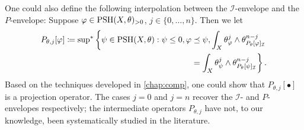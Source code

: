 \begin{remark}\label{rmk:envelopes:L2443}
    One could also define the following interpolation between the $\mathcal{I}$-envelope and the $P$-envelope: Suppose $\varphi\in \mathrm{PSH}(X,\theta)_{>0}$, $j\in \{0,\ldots,n\}$. Then we let
    \[
    \begin{split}
    P_{\theta,j}[\varphi]\coloneqq \operatorname*{sup}_{}{}\!{}^{*} \left\{ \psi\in \mathrm{PSH}(X,\theta): \psi\leq 0,\varphi\preceq \psi, \int_X \theta_{\varphi}^j\wedge \theta_{P_{\theta}[\varphi]_{\mathcal{I}}}^{n-j}\right.\\
    \left.=\int_X \theta_{\psi}^j\wedge \theta_{P_{\theta}[\psi]_{\mathcal{I}}}^{n-j} \right\}.
    \end{split}
    \]
    Based on the techniques developed in \cref{chap:comp}, one could show that $P_{\theta,j}[\bullet]$ is a projection operator. The cases $j=0$ and $j=n$ recover the $\mathcal{I}$- and $P$-envelopes respectively; the intermediate operators $P_{\theta,j}$ have not, to our knowledge, been systematically studied in the literature.
\end{remark}



%
